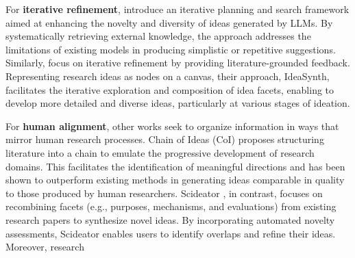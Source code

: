     For \textbf{iterative refinement}, \citet{hu2024nova} introduce an iterative planning and search framework aimed at enhancing the novelty and diversity of ideas generated by LLMs. By systematically retrieving external knowledge, the approach addresses the limitations of existing models in producing simplistic or repetitive suggestions. 
    Similarly, \citet{pu2024ideasynth} focus on iterative refinement by providing literature-grounded feedback. Representing research ideas as nodes on a canvas, their approach, IdeaSynth, facilitates the iterative exploration and composition of idea facets,  %
    enabling %
    to develop more detailed and diverse ideas, particularly at various stages of ideation. 
    \iffalse
    Complementing these efforts, \citet{sandholm2024semantic} provide a semantic navigation approach that leverages constrained problem-solution spaces and introduces automated input filtering to enhance coherence and relevancy, resulting in improved user engagement and generation quality.
    \fi
    For \textbf{human alignment}, other works %
    seek to organize information in ways that mirror human research processes. Chain of Ideas (CoI) \citep{li2024chain} proposes structuring literature into a chain to emulate the progressive development of research domains. This facilitates the identification of meaningful directions and has been shown to outperform existing methods in generating ideas comparable in quality to those produced by human researchers. Scideator \citep{radensky2024scideator}, in contrast, focuses on recombining facets (e.g., purposes, mechanisms, and evaluations) from existing research papers to synthesize novel ideas. By incorporating automated novelty assessments, Scideator enables users to identify overlaps and refine their ideas. %
    Moreover, research %
